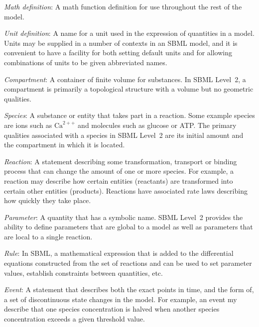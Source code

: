 \documentclass[10pt]{cekarticle}
\begin{document}
\begin{description}

\item \emph{Math definition}: A math function definition for use
    throughout the rest of the model.

\item \emph{Unit definition}: A name for a unit used in the
expression of
  quantities in a model.  Units may be supplied in a number of contexts in
  an SBML model, and it is convenient to have a facility for both setting
  default units and for allowing combinations of units to be given
  abbreviated names.

\item \emph{Compartment}: A container of finite volume for substances. In
  SBML Level~2, a compartment is primarily a topological structure with a
  volume but no geometric qualities.

\item \emph{Species}: A substance or entity that takes part in a
reaction.
  Some example species are ions such as $\text{Ca}^{2++}$ and molecules
  such as glucose or ATP.  The primary qualities associated with a species
  in SBML Level~2 are its initial amount and the compartment in which it is
  located.

\item \emph{Reaction}: A statement describing some transformation,
  transport or binding process that can change the amount of one or more
  species.  For example, a reaction may describe how certain entities
  (reactants) are transformed into certain other entities (products).
  Reactions have associated rate laws describing how quickly they take
  place.

\item \emph{Parameter}: A quantity that has a symbolic name.  SBML
Level~2
  provides the ability to define parameters that are global to a model as
  well as parameters that are local to a single reaction.

\item \emph{Rule}: In SBML, a mathematical expression that is added
  to the differential equations constructed from the set of reactions and
  can be used to set parameter values, establish constraints between
  quantities, etc.

\item \emph{Event}: A statement that describes both the exact
points in time, and the form of, a set of discontinuous state
changes in the model.  For example, an event my describe that one
species concentration is halved when another species concentration
exceeds a given threshold value.

\end{description}
\end{document}
